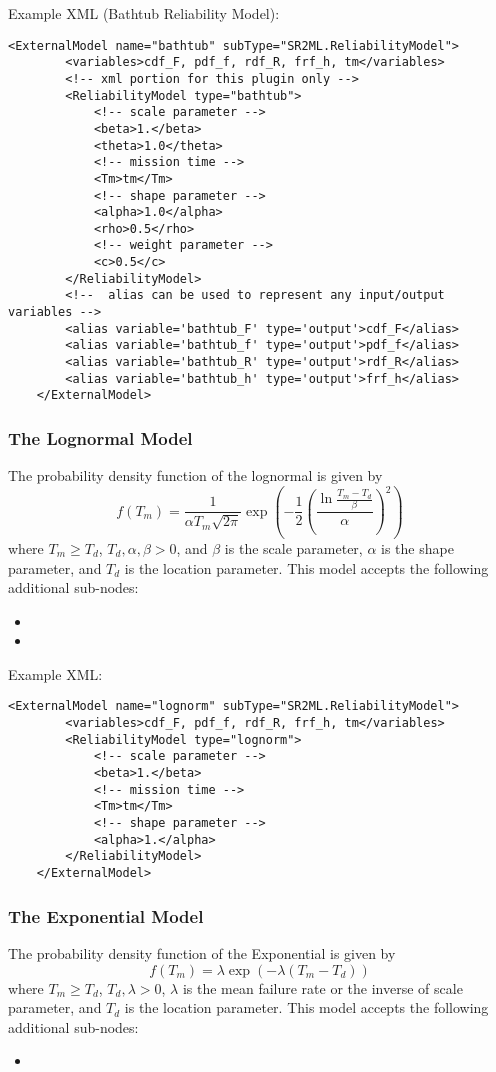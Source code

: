 Example XML (Bathtub Reliability Model):
\begin{lstlisting}[style=XML]
	<ExternalModel name="bathtub" subType="SR2ML.ReliabilityModel">
		<variables>cdf_F, pdf_f, rdf_R, frf_h, tm</variables>
		<!-- xml portion for this plugin only -->
		<ReliabilityModel type="bathtub">
			<!-- scale parameter -->
			<beta>1.</beta>
			<theta>1.0</theta>
			<!-- mission time -->
			<Tm>tm</Tm>
			<!-- shape parameter -->
			<alpha>1.0</alpha>
			<rho>0.5</rho>
			<!-- weight parameter -->
			<c>0.5</c>
		</ReliabilityModel>
		<!--  alias can be used to represent any input/output variables -->
		<alias variable='bathtub_F' type='output'>cdf_F</alias>
		<alias variable='bathtub_f' type='output'>pdf_f</alias>
		<alias variable='bathtub_R' type='output'>rdf_R</alias>
		<alias variable='bathtub_h' type='output'>frf_h</alias>
	</ExternalModel>
\end{lstlisting}

\subsubsection{The Lognormal Model}
The probability density function of the lognormal is given by
\begin{equation}
	f(T_m) = \frac{1}{\alpha T_m\sqrt{2\pi}}\exp\left(-\frac{1}{2}\left(\frac{\ln{\frac{T_m-T_d}{\beta}}}{\alpha}\right)^2\right)
\end{equation}
where $T_m\geq T_d$, $T_d, \alpha, \beta >0$, and $\beta$ is the scale parameter, $\alpha$ is the shape
parameter, and $T_d$ is the location parameter.
This model accepts the following additional sub-nodes:
\begin{itemize}
	\item {}
	\item {}
\end{itemize}

Example XML:
\begin{lstlisting}[style=XML]
	<ExternalModel name="lognorm" subType="SR2ML.ReliabilityModel">
		<variables>cdf_F, pdf_f, rdf_R, frf_h, tm</variables>
		<ReliabilityModel type="lognorm">
			<!-- scale parameter -->
			<beta>1.</beta>
			<!-- mission time -->
			<Tm>tm</Tm>
			<!-- shape parameter -->
			<alpha>1.</alpha>
		</ReliabilityModel>
	</ExternalModel>
\end{lstlisting}

\subsubsection{The Exponential Model}
The probability density function of the Exponential is given by
\begin{equation}
	f(T_m) = \lambda\exp\left(-\lambda\left(T_m-T_d\right)\right)
\end{equation}
where $T_m\geq T_d$, $T_d, \lambda >0$, $\lambda$ is the mean failure rate or the inverse of scale parameter,
and $T_d$ is the location parameter.
This model accepts the following additional sub-nodes:
\begin{itemize}
	\item {}
\end{itemize}

